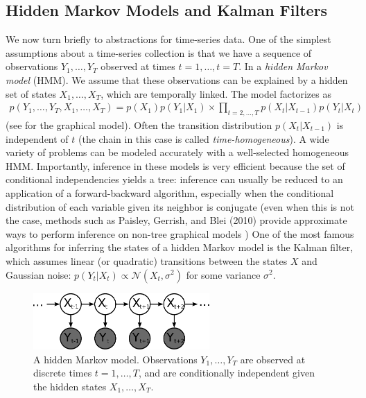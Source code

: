 
\subsection{Hidden Markov Models and Kalman Filters}
We now turn briefly to abstractions for time-series data. One of the
simplest assumptions about a time-series collection is that we have a
sequence of observations $Y_1, \ldots, Y_T$ observed at times $t=1,
\ldots, t=T$.  In a \emph{hidden Markov model} (HMM).  We assume that
these observations can be explained by a hidden set of states $X_1,
\ldots, X_T$, which are temporally linked.  The model factorizes as
\begin{align}
  p(Y_1, \ldots, Y_T, X_1, \ldots, X_T) = p(X_1) p(Y_1 | X_1) \times \prod_{t=2, \ldots, T} p(X_t | X_{t-1}) p(Y_t | X_t)
\end{align}
(see  for the graphical model).  Often the transition
distribution $p(X_t | X_{t-1})$ is independent of $t$ (the chain in
this case is called \emph{time-homogeneous}).  A wide variety of
problems can be modeled accurately with a well-selected homogeneous
HMM.  Importantly, inference in these models is very efficient because
the set of conditional independencies yields a tree: inference can
usually be reduced to an application of a forward-backward algorithm,
especially when the conditional distribution of each variable given
its neighbor is conjugate (even when this is not the case, methods
such as Paisley, Gerrish, and Blei (2010) provide approximate ways to
perform inference on non-tree graphical models \nocite{paisley:2010})
One of the most famous algorithms for inferring the states of a hidden
Markov model is the Kalman filter, which assumes linear (or quadratic)
transitions between the states $X$ and Gaussian noise: $p(Y_t | X_t)
\propto \mathcal{N}(X_t, \sigma^2)$ for some variance $\sigma^2$.
\begin{figure}
  \begin{center}
  \includegraphics[width=0.6\textwidth]{chapter_introductory_material/figs/hmm_gm.pdf}
  \end{center}
  \caption{A hidden Markov model.  Observations $Y_1, \ldots, Y_T$ are observed at discrete times $t=1, \ldots, T$, and are conditionally independent given the hidden states $X_1, \ldots, X_T$.}
  \label{fig:hmm_gm}
\end{figure}


